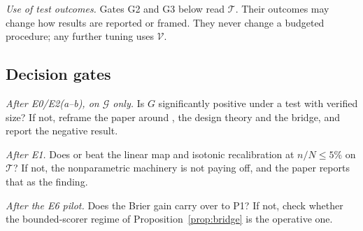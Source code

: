 \emph{Use of test outcomes.} Gates G2 and G3 below read $\mathcal T$. Their outcomes may change how
results are reported or framed. They never change a budgeted procedure; any further tuning uses
$\mathcal V$.

\subsection{Decision gates}

\begin{description}[leftmargin=0.9cm,style=nextline]
  \item[G1] \emph{After E0/E2(a--b), on $\mathcal G$ only.} Is $G$ significantly positive under a test
        with verified size? If not, reframe the paper around \sfsp{}, the design theory and the
        bridge, and report the negative result.
  \item[G2] \emph{After E1.} Does \dfsp{} or \sfsp{} beat the linear map and isotonic recalibration at
        $n/N\le5\%$ on $\mathcal T$? If not, the nonparametric machinery is not paying off, and the
        paper reports that as the finding.
  \item[G3] \emph{After the E6 pilot.} Does the Brier gain carry over to P1? If not, check whether the
        bounded-scorer regime of Proposition~\ref{prop:bridge} is the operative one.
\end{description}
